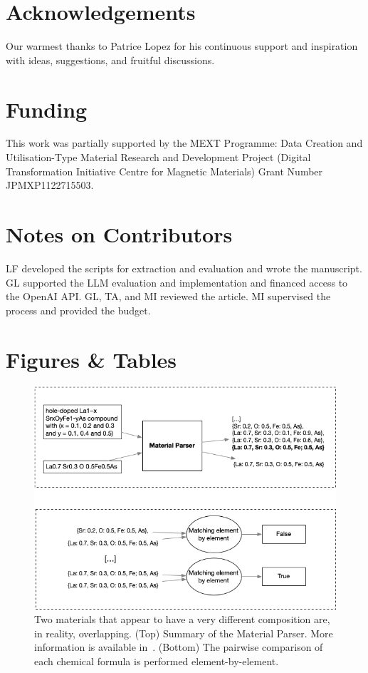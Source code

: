 \section*{Acknowledgements}
Our warmest thanks to Patrice Lopez for his continuous support and inspiration with ideas, suggestions, and fruitful discussions.


\section*{Funding}
This work was partially supported by the MEXT Programme: Data Creation and Utilisation-Type Material Research and Development Project (Digital Transformation Initiative Centre for Magnetic Materials) Grant Number JPMXP1122715503.


\section*{Notes on Contributors}
LF developed the scripts for extraction and evaluation and wrote the manuscript.
GL supported the LLM evaluation and implementation and financed access to the OpenAI API. 
GL, TA, and MI reviewed the article.
MI supervised the process and provided the budget. 






\section*{Figures \& Tables}

\begin{figure}[ht]
  \centering
  \includegraphics[width=1\textwidth]{figures/formula-matching-schema} 
  \caption{Two materials that appear to have a very different composition are, in reality, overlapping. (Top) Summary of the Material Parser. More information is available in~\cite{lfoppiano2023automatic}. (Bottom) The pairwise comparison of each chemical formula is performed element-by-element.  }
  \label{fig:formula-matching-schema}
\end{figure}


